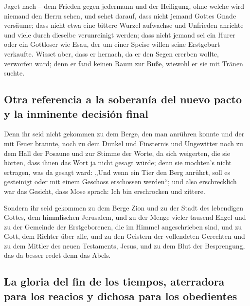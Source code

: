  Jaget nach -- dem Frieden gegen jedermann und der
Heiligung, ohne welche wird niemand den Herrn sehen,  und
sehet darauf, dass nicht jemand Gottes Gnade versäume; dass nicht etwa
eine bittere Wurzel aufwachse und Unfrieden anrichte und viele durch
dieselbe verunreinigt werden;  dass nicht jemand sei ein
Hurer oder ein Gottloser wie Esau, der um einer Speise willen seine
Erstgeburt verkaufte.  Wisset aber, dass er hernach, da
er den Segen ererben wollte, verworfen ward; denn er fand keinen Raum
zur Buße, wiewohl er sie mit Tränen suchte.

\hypertarget{otra-referencia-a-la-soberanuxeda-del-nuevo-pacto-y-la-inminente-decisiuxf3n-final}{%
\subsection{Otra referencia a la soberanía del nuevo pacto y la
inminente decisión
final}\label{otra-referencia-a-la-soberanuxeda-del-nuevo-pacto-y-la-inminente-decisiuxf3n-final}}

 Denn ihr seid nicht gekommen zu dem Berge, den man
anrühren konnte und der mit Feuer brannte, noch zu dem Dunkel und
Finsternis und Ungewitter  noch zu dem Hall der Posaune
und zur Stimme der Worte, da sich weigerten, die sie hörten, dass ihnen
das Wort ja nicht gesagt würde;  denn sie mochten's nicht
ertragen, was da gesagt ward: „Und wenn ein Tier den Berg anrührt, soll
es gesteinigt oder mit einem Geschoss erschossen werden``;
 und also erschrecklich war das Gesicht, dass Mose
sprach: Ich bin erschrocken und zittere.

 Sondern ihr seid gekommen zu dem Berge Zion und zu der
Stadt des lebendigen Gottes, dem himmlischen Jerusalem, und zu der Menge
vieler tausend Engel  und zu der Gemeinde der
Erstgeborenen, die im Himmel angeschrieben sind, und zu Gott, dem
Richter über alle, und zu den Geistern der vollendeten Gerechten
 und zu dem Mittler des neuen Testaments, Jesus, und zu
dem Blut der Besprengung, das da besser redet denn das Abels.

\hypertarget{la-gloria-del-fin-de-los-tiempos-aterradora-para-los-reacios-y-dichosa-para-los-obedientes}{%
\subsection{La gloria del fin de los tiempos, aterradora para los
reacios y dichosa para los
obedientes}\label{la-gloria-del-fin-de-los-tiempos-aterradora-para-los-reacios-y-dichosa-para-los-obedientes}}

